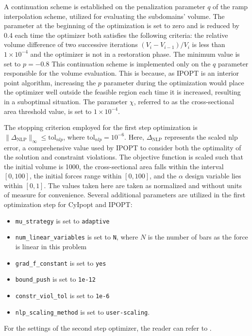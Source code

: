 A continuation scheme is established on the penalization parameter $q$ of the \gls{ramp} interpolation scheme, utilized for evaluating the subdomains' volume. The parameter at the beginning of the optimization is set to zero and is reduced by 0.4 each time the optimizer both satisfies the following criteria: the relative volume difference of two successive iterations $(V_i-V_{i-1})/V_i$ is less than $1 \times 10^{-4}$ and the optimizer is not in a restoration phase. The minimum value is set to $p=-0.8$ This continuation scheme is implemented only on the $q$ parameter responsible for the volume evaluation. This is because, as IPOPT is an interior point algorithm,  increasing the $p$ parameter during the optimization would place the optimizer well outside the feasible region each time it is increased, resulting in a suboptimal situation. The parameter $\chi$, referred to as the cross-sectional area threshold value, is set to $1 \times 10^{-4}$. 

The stopping criterion employed for the first step optimization is $\|\Delta_{\text{NLP}}\|_\infty \leq \text{tol}_{nlp}$, where $\text{tol}_{nlp}=10^{-6}$. Here, $\Delta_{\text{NLP}}$ represents the scaled \gls{nlp} error, a comprehensive value used by IPOPT to consider both the optimality of the solution and constraint violations. The objective function is scaled such that the initial volume is 1000, the cross-sectional area falls within the interval $[0,100]$, the initial forces range within $[0,100]$, and the $\alpha$ design variable lies within $[0,1]$. The values taken here are taken as normalized and without units of measure for convenience. Several additional parameters are utilized in the first optimization step for CyIpopt and IPOPT:
\begin{itemize}
    \item \texttt{mu\_strategy} is set to \texttt{adaptive}
    \item \texttt{num\_linear\_variables} is set to \texttt{N}, where $N$ is the number of bars as the force is linear in this problem
    \item \texttt{grad\_f\_constant} is set to \texttt{yes}
    \item \texttt{bound\_push} is set to \texttt{1e-12}
    \item \texttt{constr\_viol\_tol} is set to \texttt{1e-6}
    \item \texttt{nlp\_scaling\_method} is set to \texttt{user-scaling}.
\end{itemize}
For the settings of the second step optimizer, the reader can refer to .

